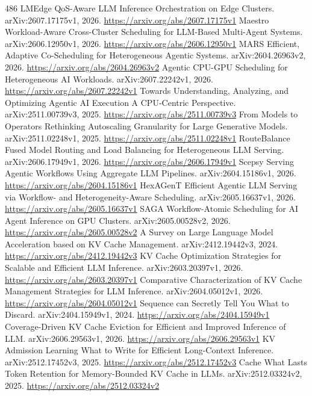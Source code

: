 \documentclass[11pt]{article}
\begin{document}
\begin{thebibliography}{486}
 LMEdge QoS-Aware LLM Inference Orchestration on Edge Clusters. arXiv:2607.17175v1, 2026. \url{https://arxiv.org/abs/2607.17175v1}
 Maestro Workload-Aware Cross-Cluster Scheduling for LLM-Based Multi-Agent Systems. arXiv:2606.12950v1, 2026. \url{https://arxiv.org/abs/2606.12950v1}
 MARS Efficient, Adaptive Co-Scheduling for Heterogeneous Agentic Systems. arXiv:2604.26963v2, 2026. \url{https://arxiv.org/abs/2604.26963v2}
 Agentic CPU-GPU Scheduling for Heterogeneous AI Workloads. arXiv:2607.22242v1, 2026. \url{https://arxiv.org/abs/2607.22242v1}
 Towards Understanding, Analyzing, and Optimizing Agentic AI Execution A CPU-Centric Perspective. arXiv:2511.00739v3, 2025. \url{https://arxiv.org/abs/2511.00739v3}
 From Models to Operators Rethinking Autoscaling Granularity for Large Generative Models. arXiv:2511.02248v1, 2025. \url{https://arxiv.org/abs/2511.02248v1}
 RouteBalance Fused Model Routing and Load Balancing for Heterogeneous LLM Serving. arXiv:2606.17949v1, 2026. \url{https://arxiv.org/abs/2606.17949v1}
 Scepsy Serving Agentic Workflows Using Aggregate LLM Pipelines. arXiv:2604.15186v1, 2026. \url{https://arxiv.org/abs/2604.15186v1}
 HexAGenT Efficient Agentic LLM Serving via Workflow- and Heterogeneity-Aware Scheduling. arXiv:2605.16637v1, 2026. \url{https://arxiv.org/abs/2605.16637v1}
 SAGA Workflow-Atomic Scheduling for AI Agent Inference on GPU Clusters. arXiv:2605.00528v2, 2026. \url{https://arxiv.org/abs/2605.00528v2}
 A Survey on Large Language Model Acceleration based on KV Cache Management. arXiv:2412.19442v3, 2024. \url{https://arxiv.org/abs/2412.19442v3}
 KV Cache Optimization Strategies for Scalable and Efficient LLM Inference. arXiv:2603.20397v1, 2026. \url{https://arxiv.org/abs/2603.20397v1}
 Comparative Characterization of KV Cache Management Strategies for LLM Inference. arXiv:2604.05012v1, 2026. \url{https://arxiv.org/abs/2604.05012v1}
 Sequence can Secretly Tell You What to Discard. arXiv:2404.15949v1, 2024. \url{https://arxiv.org/abs/2404.15949v1}
 Coverage-Driven KV Cache Eviction for Efficient and Improved Inference of LLM. arXiv:2606.29563v1, 2026. \url{https://arxiv.org/abs/2606.29563v1}
 KV Admission Learning What to Write for Efficient Long-Context Inference. arXiv:2512.17452v3, 2025. \url{https://arxiv.org/abs/2512.17452v3}
 Cache What Lasts Token Retention for Memory-Bounded KV Cache in LLMs. arXiv:2512.03324v2, 2025. \url{https://arxiv.org/abs/2512.03324v2}

\end{thebibliography}
\end{document}
